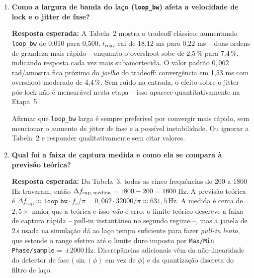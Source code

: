 \documentclass[11pt,a4paper]{article}
\begin{document}
\begin{enumerate}[label=\textbf{Q\arabic*.}, leftmargin=*, itemsep=1em]
    \begin{nota}
      Confundir a convergência da saída com o desaparecimento completo de oscilações
      transitórias. O sobresinal pode persistir brevemente mesmo em lock. Outro erro
      é declarar lock só observando o Time Sink a olho, sem o critério numérico aplicado
      à cauda do sinal salvo via File Sink.
    \end{nota}

  \item \textbf{Como a largura de banda do laço (\texttt{loop\_bw}) afeta a velocidade de lock e o jitter de fase?}

    \textbf{Resposta esperada:} A Tabela~2 mostra o tradeoff clássico: aumentando
    \texttt{loop\_bw} de 0{,}010 para 0{,}500, $t_\text{conv}$ cai de 18{,}12 ms para
    0{,}22 ms -- duas ordens de grandeza mais rápido -- enquanto o overshoot sobe
    de 2{,}5\,\% para 7{,}4\,\%, indicando resposta cada vez mais subamortecida.
    O valor padrão $0{,}062$\,rad/amostra fica próximo do \emph{joelho} do
    tradeoff: convergência em 1{,}53 ms com overshoot moderado de 4{,}4\,\%.
    Sem ruído na entrada, o efeito sobre o jitter pós-lock não é mensurável
    nesta etapa -- isso aparece quantitativamente na Etapa~5.

    \begin{nota}
      Afirmar que \texttt{loop\_bw} larga é sempre preferível por convergir mais rápido,
      sem mencionar o aumento de jitter de fase e a possível instabilidade. Ou
      ignorar a Tabela~2 e responder qualitativamente sem citar valores.
    \end{nota}

  \item \textbf{Qual foi a faixa de captura medida e como ela se compara à previsão teórica?}

    \textbf{Resposta esperada:} Da Tabela~3, todas as cinco frequências de 200 a 1800
    Hz travaram, então $\Delta f_\text{cap,\,medida} = 1800 - 200 = 1600$\,Hz. A
    previsão teórica é $\Delta f_\text{cap} \approx \texttt{loop\_bw}\cdot f_s/\pi
    = 0{,}062 \cdot 32000/\pi \approx 631{,}5$\,Hz. A medida é cerca de
    $2{,}5\times$ maior que a teórica e isso \emph{não} é erro: o limite teórico
    descreve a faixa de captura rápida -- pull-in instantâneo no segundo regime --,
    mas a janela de 2\,s usada na simulação dá ao laço tempo suficiente para fazer
    \emph{pull-in lento}, que estende o range efetivo até o limite duro imposto
    por \texttt{Max/Min Phase/sample} = $\pm 2000$\,Hz. Discrepâncias adicionais
    vêm da não-linearidade do detector de fase ($\sin(\phi)$ em vez de $\phi$) e
    da quantização discreta do filtro de laço.


\end{enumerate}
\end{document}
